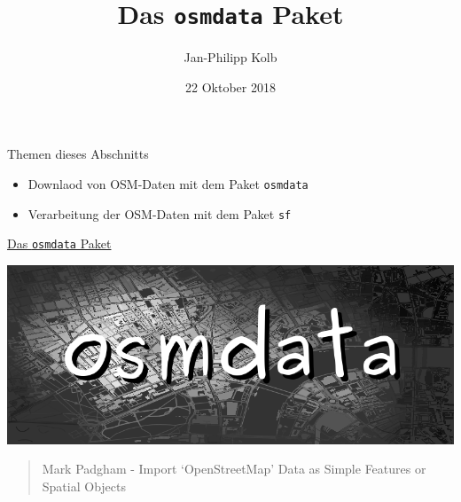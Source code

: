 \documentclass[ignorenonframetext,]{beamer}
\title{Das \texttt{osmdata} Paket}
\author{Jan-Philipp Kolb}
\date{22 Oktober 2018}
\begin{document}
\frame{\titlepage}

\begin{frame}[fragile]{Themen dieses Abschnitts}
\protect\hypertarget{themen-dieses-abschnitts}{}

\begin{itemize}
\item
  Downlaod von OSM-Daten mit dem Paket \texttt{osmdata}
\item
  Verarbeitung der OSM-Daten mit dem Paket \texttt{sf}
\end{itemize}

\end{frame}

\begin{frame}{\href{https://github.com/ropensci/osmdata}{Das
\texttt{osmdata} Paket}}
\protect\hypertarget{das-osmdata-paket}{}

\includegraphics{figure/osmdatatitle.png}

\begin{quote}
Mark Padgham - Import `OpenStreetMap' Data as Simple Features or Spatial
Objects
\end{quote}

\end{frame}
\end{document}
